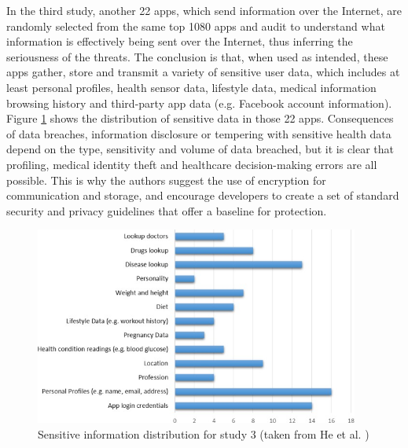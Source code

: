 In the third study, another 22 apps, which send information over the Internet, are randomly selected from the same top 1080 apps and audit to understand what information is effectively being sent over the Internet, thus inferring the seriousness of the threats. The conclusion is that, when used as intended, these apps gather, store and transmit a variety of sensitive user data, which includes at least personal profiles, health sensor data, lifestyle data, medical information browsing history and third-party app data (e.g. Facebook account information). Figure \ref{fig:sensitivedistribution} shows the distribution of sensitive data in those 22 apps. Consequences of data breaches, information disclosure or tempering with sensitive health data depend on the type, sensitivity and volume of data breached, but it is clear that profiling, medical identity theft and healthcare decision-making errors are all possible. This is why the authors suggest the use of encryption for communication and storage, and encourage developers to create a set of standard security and privacy guidelines that offer a baseline for protection.

\begin{figure}[t!]
  \centering
  \includegraphics[width=0.95\textwidth]{img/sensitivedistribution.jpg}
  \caption{Sensitive information distribution for study 3 (taken from  He et al. \cite{he2014security})}
  \label{fig:sensitivedistribution}
\end{figure}


